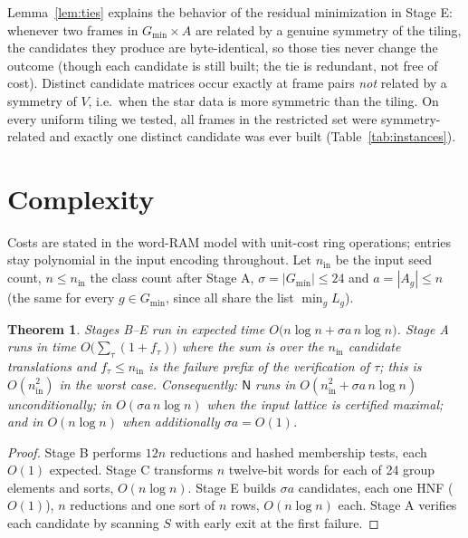 \documentclass[11pt]{article}
\newtheorem{theorem}{Theorem}[section]
\theoremstyle{definition}
\newcommand{\Gmin}{G_{\min}}
\newcommand{\N}{\mathsf{N}}
\begin{document}
Lemma~\ref{lem:ties} explains the behavior of the residual minimization in Stage E:
whenever two frames in $\Gmin\times A$ are related by a genuine symmetry of the tiling, the
candidates they produce are byte-identical, so those ties never change the outcome (though
each candidate is still built; the tie is redundant, not free of cost). Distinct candidate
matrices occur exactly at frame pairs \emph{not} related by a symmetry of $V$, i.e.\ when
the star data is more symmetric than the tiling. On every uniform tiling we tested, all
frames in the restricted set were symmetry-related and exactly one distinct candidate was
ever built (Table~\ref{tab:instances}).

\section{Complexity}\label{sec:complexity}

Costs are stated in the word-RAM model with unit-cost ring operations; entries stay
polynomial in the input encoding throughout. Let $n_{\mathrm{in}}$ be the input seed count,
$n\le n_{\mathrm{in}}$ the class count after Stage A, $\sigma=|\Gmin|\le24$ and
$a=|A_g|\le n$ (the same for every $g\in\Gmin$, since all share the list $\min_g L_g$).

\begin{theorem}\label{thm:complexity}
Stages B--E run in expected time $O\bigl(n\log n+\sigma a\, n\log n\bigr)$. Stage A runs in
time $O\bigl(\sum_{\tau}(1+f_\tau)\bigr)$ where the sum is over the $n_{\mathrm{in}}$
candidate translations and $f_\tau\le n_{\mathrm{in}}$ is the failure prefix of the
verification of $\tau$; this is $O(n_{\mathrm{in}}^2)$ in the worst case. Consequently:
$\N$ runs in $O(n_{\mathrm{in}}^2+\sigma a\,n\log n)$ unconditionally; in
$O(\sigma a\,n\log n)$ when the input lattice is certified maximal; and in $O(n\log n)$
when additionally $\sigma a=O(1)$.
\end{theorem}

\begin{proof}
Stage B performs $12n$ reductions and hashed membership tests, each $O(1)$ expected. Stage
C transforms $n$ twelve-bit words for each of 24 group elements and sorts, $O(n\log n)$.
Stage E builds $\sigma a$ candidates, each one HNF ($O(1)$), $n$ reductions and one sort of
$n$ rows, $O(n\log n)$ each. Stage A verifies each candidate by scanning $S$ with early
exit at the first failure.
\end{proof}
\end{document}
